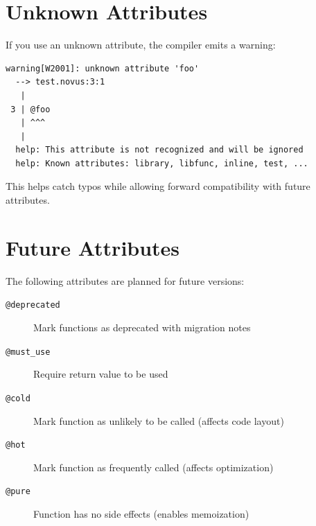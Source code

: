 \section{Unknown Attributes}

If you use an unknown attribute, the compiler emits a warning:

\begin{lstlisting}[style=plain]
warning[W2001]: unknown attribute 'foo'
  --> test.novus:3:1
   |
 3 | @foo
   | ^^^
   |
  help: This attribute is not recognized and will be ignored
  help: Known attributes: library, libfunc, inline, test, ...
\end{lstlisting}

This helps catch typos while allowing forward compatibility with future attributes.

\section{Future Attributes}

The following attributes are planned for future versions:

\begin{description}
    \item[\texttt{@deprecated}] Mark functions as deprecated with migration notes
    \item[\texttt{@must\_use}] Require return value to be used
    \item[\texttt{@cold}] Mark function as unlikely to be called (affects code layout)
    \item[\texttt{@hot}] Mark function as frequently called (affects optimization)
    \item[\texttt{@pure}] Function has no side effects (enables memoization)
\end{description}
